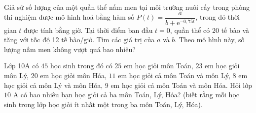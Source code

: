 \begin{ex}%
	Giả sử số lượng của một quần thể nấm men tại môi trường nuôi cấy trong phòng thí nghiệm được mô hinh hoá bằng hàm số $P(t)=\dfrac{a}{b+\mathrm{e}^{-0,75t}}$, trong đó thời gian $t$ được tính bằng giờ. Tại thời điểm ban đầu $t=0$, quần thể có 20 tế bào và tăng với tốc độ 12 tế bào/giờ. Tìm các giá trị của $a$ và $b$. Theo mô hình này, số lượng nấm men không vượt quá bao nhiêu?
\end{ex}

\begin{ex}%
	Lớp 10A có $45$ học sinh trong đó có $25$ em học giỏi môn Toán, $23$ em học giỏi môn Lý, $20$ em học giỏi môn Hóa, $11$ em học giỏi cả môn Toán và môn Lý, $8$ em học giỏi cả môn Lý và môn Hóa, $9$ em học giỏi cả môn Toán và môn Hóa. Hỏi lớp $10$ A có bao nhiêu bạn học giỏi cả ba môn Toán, Lý, Hóa? (biết rằng mỗi học sinh trong lớp học giỏi ít nhất một trong ba môn Toán, Lý, Hóa).
\end{ex}

